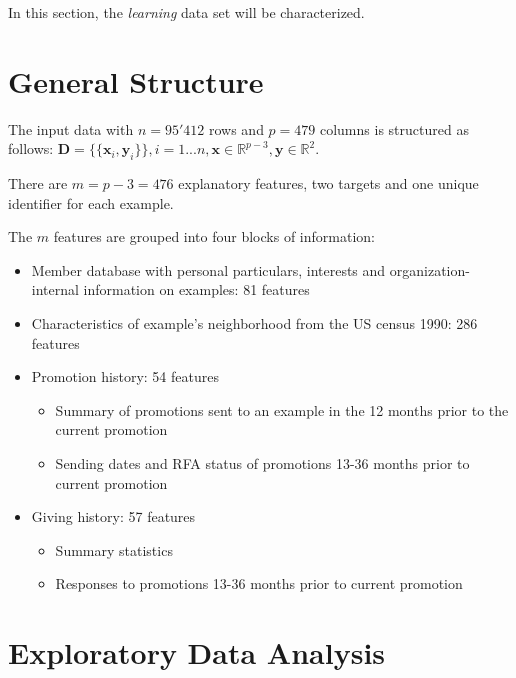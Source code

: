 \documentclass[
  11pt,
  a4paper,
  DIV=12,captions=tableheading,oneside,titlepage]{scrbook}
\providecommand{\tightlist}{%
  \setlength{\itemsep}{0pt}\setlength{\parskip}{0pt}}
\begin{document}
In this section, the \emph{learning} data set will be characterized.

\hypertarget{general-structure}{%
\section{General Structure}\label{general-structure}}

The input data with \(n = 95'412\) rows and \(p= 479\) columns is structured as follows: \(\mathbf{D} = \{\{\mathbf{x}_i,\mathbf{y}_i\}\}, i = 1 ... n, \mathbf{x} \in \mathbb{R}^{p-3}, \mathbf{y} \in \mathbb{R}^2\).

There are \(m = p-3 = 476\) explanatory features, two targets and one unique identifier for each example.

The \(m\) features are grouped into four blocks of information:

\begin{itemize}
\tightlist
\item
  Member database with personal particulars, interests and organization-internal information on examples: 81 features
\item
  Characteristics of example's neighborhood from the US census 1990: 286 features
\item
  Promotion history: 54 features

  \begin{itemize}
  \tightlist
  \item
    Summary of promotions sent to an example in the 12 months prior to the current promotion
  \item
    Sending dates and RFA status of promotions 13-36 months prior to current promotion
  \end{itemize}
\item
  Giving history: 57 features

  \begin{itemize}
  \tightlist
  \item
    Summary statistics
  \item
    Responses to promotions 13-36 months prior to current promotion
  \end{itemize}
\end{itemize}

\hypertarget{exploratory-data-analysis}{%
\section{Exploratory Data Analysis}\label{exploratory-data-analysis}}
\end{document}
